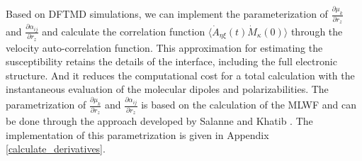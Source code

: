 Based on DFTMD simulations, we can implement the parameterization of $\frac{\partial \mu_{k}}{\partial r_z}$ and $\frac{\partial\alpha_{ij}}{\partial r_z}$
and calculate the correlation function $\langle\dot{A}_{\eta\xi}(t)\dot{M}_{\kappa}(0)\rangle$ through the velocity auto-correlation function. 
This approximation for estimating the susceptibility retains the details of the interface, including the full electronic structure. 
And it reduces the computational cost for a total calculation with the instantaneous evaluation of the molecular dipoles and polarizabilities\cite{Sulpizi2013}. 
The parametrization of $\frac{\partial \mu_{k}}{\partial r_z}$ and $\frac{\partial\alpha_{ij}}{\partial r_z}$ is based 
on the calculation of the MLWF\cite{Marzari1997} 
 and can be done through the approach developed by Salanne \etal\cite{Salanne08} and Khatib \etal\cite{Khatib2017}.
The implementation of this parametrization is given in Appendix \ref{calculate_derivatives}.


